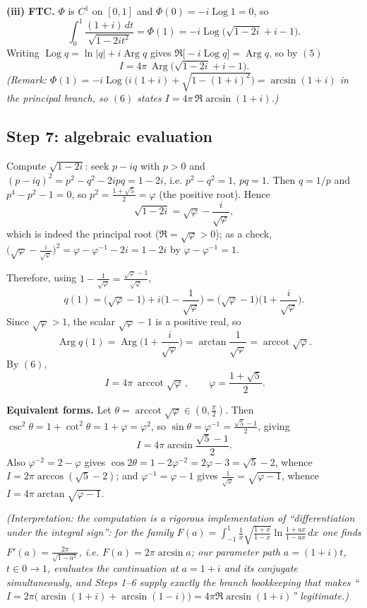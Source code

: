 \documentclass[11pt]{article}
\theoremstyle{remark}
\begin{document}
\textbf{(iii) FTC.} $\Phi$ is $C^1$ on $[0,1]$ and $\Phi(0)=-i\operatorname{Log}1=0$, so
$$\int_0^1\frac{(1+i)\,dt}{\sqrt{1-2it^2}}=\Phi(1)=-i\operatorname{Log}\big(\sqrt{1-2i}+i-1\big).$$
Writing $\operatorname{Log}q=\ln|q|+i\operatorname{Arg}q$ gives $\Re\big[-i\operatorname{Log}q\big]=\operatorname{Arg}q$, so by $(5)$
\begin{equation}I=4\pi\,\operatorname{Arg}\big(\sqrt{1-2i}+i-1\big). \tag{6}\end{equation}
\textit{(Remark: $\Phi(1)=-i\operatorname{Log}\big(i(1+i)+\sqrt{1-(1+i)^2}\big)=\arcsin(1+i)$ in the principal branch, so $(6)$ states $I=4\pi\,\Re\arcsin(1+i)$.)}

\subsection*{Step 7: algebraic evaluation}

Compute $\sqrt{1-2i}$: seek $p-iq$ with $p>0$ and $(p-iq)^2=p^2-q^2-2ipq=1-2i$, i.e. $p^2-q^2=1$, $pq=1$. Then $q=1/p$ and $p^4-p^2-1=0$, so $p^2=\frac{1+\sqrt5}{2}=\varphi$ (the positive root). Hence
$$\sqrt{1-2i}=\sqrt\varphi-\frac{i}{\sqrt\varphi},$$
which is indeed the principal root ($\Re=\sqrt\varphi>0$); as a check, $\big(\sqrt\varphi-\tfrac{i}{\sqrt\varphi}\big)^2=\varphi-\varphi^{-1}-2i=1-2i$ by $\varphi-\varphi^{-1}=1$.

Therefore, using $1-\frac{1}{\sqrt\varphi}=\frac{\sqrt\varphi-1}{\sqrt\varphi}$,
$$q(1)=\big(\sqrt\varphi-1\big)+i\Big(1-\frac1{\sqrt\varphi}\Big)
=\big(\sqrt\varphi-1\big)\Big(1+\frac{i}{\sqrt\varphi}\Big).$$
Since $\sqrt\varphi>1$, the scalar $\sqrt\varphi-1$ is a positive real, so
$$\operatorname{Arg}q(1)=\operatorname{Arg}\Big(1+\frac{i}{\sqrt\varphi}\Big)=\arctan\frac{1}{\sqrt\varphi}=\operatorname{arccot}\sqrt\varphi .$$
By $(6)$,
$$\boxed{\,I=4\pi\,\operatorname{arccot}\sqrt\varphi\,,\qquad \varphi=\frac{1+\sqrt5}{2}.}$$

\textbf{Equivalent forms.} Let $\theta=\operatorname{arccot}\sqrt\varphi\in(0,\tfrac\pi2)$. Then $\csc^2\theta=1+\cot^2\theta=1+\varphi=\varphi^2$, so $\sin\theta=\varphi^{-1}=\frac{\sqrt5-1}{2}$, giving
$$I=4\pi\arcsin\frac{\sqrt5-1}{2}.$$
Also $\varphi^{-2}=2-\varphi$ gives $\cos2\theta=1-2\varphi^{-2}=2\varphi-3=\sqrt5-2$, whence $I=2\pi\arccos(\sqrt5-2)$; and $\varphi^{-1}=\varphi-1$ gives $\frac{1}{\sqrt\varphi}=\sqrt{\varphi-1}$, whence $I=4\pi\arctan\sqrt{\varphi-1}$.

\textit{(Interpretation: the computation is a rigorous implementation of ``differentiation under the integral sign'': for the family $F(a)=\int_{-1}^1\frac1x\sqrt{\frac{1+x}{1-x}}\ln\frac{1+ax}{1-ax}\,dx$ one finds $F'(a)=\frac{2\pi}{\sqrt{1-a^2}}$, i.e. $F(a)=2\pi\arcsin a$; our parameter path $a=(1+i)t$, $t\in0\to1$, evaluates the continuation at $a=1+i$ and its conjugate simultaneously, and Steps 1--6 supply exactly the branch bookkeeping that makes ``$I=2\pi\big(\arcsin(1+i)+\arcsin(1-i)\big)=4\pi\Re\arcsin(1+i)$'' legitimate.)}
\end{document}
